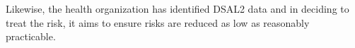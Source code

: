 \begin{minipage}[t]{0.79\textwidth}
  Likewise, the health organization has identified DSAL2 data and in deciding to treat the risk, it aims to ensure risks are reduced as low as reasonably practicable. 
\end{minipage}
\begin{minipage}[t]{0.2\textwidth}
  \centering{}
\end{minipage}


